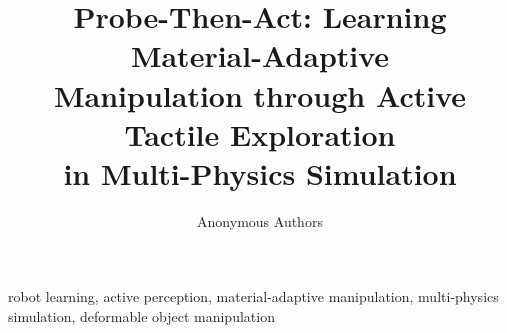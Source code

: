 \documentclass[journal]{IEEEtran}
\title{Probe-Then-Act: Learning Material-Adaptive\\ Manipulation through Active Tactile Exploration\\ in Multi-Physics Simulation}
\author{Anonymous Authors}
\theoremstyle{plain}
\theoremstyle{definition}
\begin{document}
\maketitle

\begin{abstract}

\end{abstract}

\begin{IEEEkeywords}
robot learning, active perception, material-adaptive manipulation, multi-physics simulation, deformable object manipulation
\end{IEEEkeywords}











\end{document}
